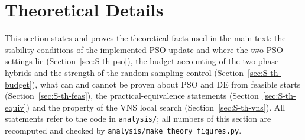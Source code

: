 \makeatletter
{}
\makeatother

\section{Theoretical Details}
\label{sec:S-theory}
This section states and proves the theoretical facts used in the main text: the stability conditions of the implemented PSO update and where the two PSO settings lie (Section~\ref{sec:S-th-pso}), the budget accounting of the two-phase hybrids and the strength of the random-sampling control (Section~\ref{sec:S-th-budget}), what can and cannot be proven about PSO and DE from feasible starts (Section~\ref{sec:S-th-feas}), the practical-equivalence statements (Section~\ref{sec:S-th-equiv}) and the property of the VNS local search (Section~\ref{sec:S-th-vns}). All statements refer to the code in \texttt{analysis/}; all numbers of this section are recomputed and checked by \texttt{analysis/make\_theory\_figures.py}.

